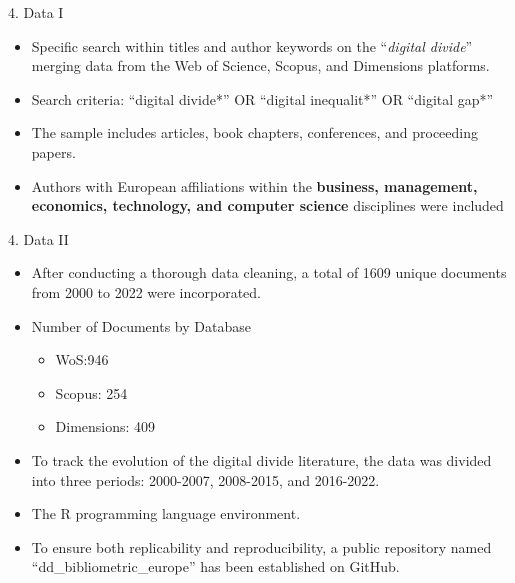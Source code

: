 \documentclass[
  ignorenonframetext,
]{beamer}
\providecommand{\tightlist}{%
  \setlength{\itemsep}{0pt}\setlength{\parskip}{0pt}}
\begin{document}
\begin{frame}{4. Data I}
\protect\hypertarget{data-i}{}
\begin{itemize}
\tightlist
\item
  Specific search within titles and author keywords on the
  ``\emph{digital divide}'' merging data from the Web of Science,
  Scopus, and Dimensions platforms.
\item
  Search criteria: ``digital divide*'' OR ``digital inequalit*'' OR
  ``digital gap*''
\item
  The sample includes articles, book chapters, conferences, and
  proceeding papers.
\item
  Authors with European affiliations within the \textbf{business,
  management, economics, technology, and computer science} disciplines
  were included
\end{itemize}
\end{frame}

\begin{frame}{4. Data II}
\protect\hypertarget{data-ii}{}
\begin{itemize}
\item
  After conducting a thorough data cleaning, a total of 1609 unique
  documents from 2000 to 2022 were incorporated.
\item
  Number of Documents by Database

  \begin{itemize}
  \tightlist
  \item
    WoS:946
  \item
    Scopus: 254
  \item
    Dimensions: 409
  \end{itemize}
\item
  To track the evolution of the digital divide literature, the data was
  divided into three periods: 2000-2007, 2008-2015, and 2016-2022.
\item
  The R programming language environment.
\item
  To ensure both replicability and reproducibility, a public repository
  named ``dd\_bibliometric\_europe'' has been established on GitHub.
\end{itemize}
\end{frame}
\end{document}
